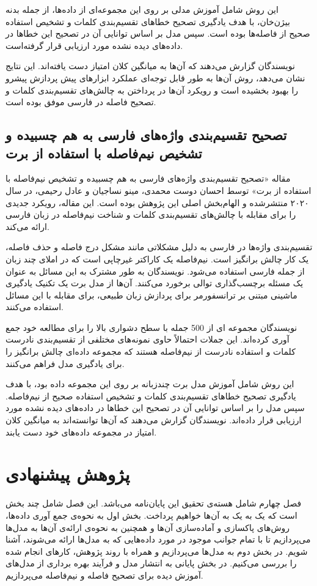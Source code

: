 این روش شامل آموزش مدلی بر روی این مجموعه‌ای از داده‌ها، از جمله بدنه بیژن‌خان، با هدف یادگیری تصحیح خطاهای تقسیم‌بندی کلمات و تشخیص استفاده صحیح از فاصله‌ها بوده است. سپس مدل بر اساس توانایی آن در تصحیح این خطاها در داده‌های دیده نشده مورد ارزیابی قرار گرفته‌است.

نویسندگان گزارش می‌دهند که آن‌ها به میانگین کلان امتیاز دست یافته‌اند. این نتایج نشان می‌دهد، روش آن‌ها به طور قابل توجه‌ای عملکرد ابزارهای پیش پردازش پیشرو را بهبود بخشیده است و رویکرد آن‌ها در پرداختن به چالش‌های تقسیم‌بندی کلمات و تصحیح فاصله‌ در فارسی موفق بوده است.\cite{Panahandeh2019CorrectionOS}


\section{تصحیح تقسیم‌بندی واژه‌های فارسی به هم چسبیده و تشخیص نیم‌فاصله با استفاده از برت}
\hspace{30pt}
مقاله «تصحیح تقسیم‌بندی واژه‌های فارسی به هم چسبیده و تشخیص نیم‌فاصله با استفاده از برت» توسط احسان دوست محمدی، مینو نساجیان و عادل رحیمی، در سال ۲۰۲۰ منتشر‌شده و الهام‌بخش اصلی این پژوهش بوده است. این مقاله، رویکرد جدیدی را برای مقابله با چالش‌های تقسیم‌بندی کلمات و شناخت نیم‌فاصله در زبان فارسی ارائه می‌کند.

تقسیم‌بندی واژه‌ها در فارسی به دلیل مشکلاتی مانند مشکل درج فاصله و حذف فاصله، یک کار چالش برانگیز است. نیم‌فاصله یک کاراکتر غیرچاپی است که در املای چند زبان از جمله فارسی استفاده می‌شود. نویسندگان به طور مشترک به این مسائل به عنوان یک مسئله برچسب‌گذاری توالی برخورد می‌کنند. آن‌ها از مدل برت یک تکنیک یادگیری ماشینی مبتنی بر ترانسفورمر برای پردازش زبان طبیعی، برای مقابله با این مسائل استفاده می‌کنند.

نویسندگان مجموعه ای از 500 جمله با سطح دشواری بالا را برای مطالعه خود جمع آوری کرده‌اند. این جملات احتمالاً حاوی نمونه‌های مختلفی از تقسیم‌بندی نادرست کلمات و استفاده نادرست از نیم‌فاصله هستند که مجموعه داده‌ای چالش برانگیز را برای یادگیری مدل فراهم می‌کنند.

این روش شامل آموزش مدل برت چند‌زبانه بر روی این مجموعه داده بود، با هدف یادگیری تصحیح خطاهای تقسیم‌بندی کلمات و تشخیص استفاده صحیح از نیم‌فاصله. سپس مدل را بر اساس توانایی آن در تصحیح این خطاها در داده‌های دیده نشده مورد ارزیابی قرار داده‌اند. نویسندگان گزارش می‌دهند که آن‌ها توانسته‌اند به میانگین کلان امتیاز  در مجموعه داده‌‌های خود دست یابند. \cite{doostmohammadi-etal-2020-joint}
\chapter{پژوهش پیشنهادی}
فصل چهارم شامل هسته‌ى تحقیق این پایان‌نامه می‌باشد. این فصل شامل چند بخش است که یک به یک به آن‌ها خواهیم پرداخت. بخش اول به نحوه‌ی جمع آوری داده‌ها، روش‌های پاکسازی و آماده‌سازی آن‌ها و همچنین به نحوه‌ی ارائه‌ی آن‌ها به مدل‌ها می‌پردازیم تا با تمام جوانب موجود در مورد داده‌هایی که به مدل‌ها ارائه می‌شوند‌، آشنا شویم. در بخش دوم به مدل‌ها می‌پردازیم و همراه با روند پژوهش، کار‌های انجام شده را بررسی می‌کنیم. در بخش پایانی به انتشار مدل و فرآیند بهره برداری از مدل‌های آموزش دیده برای تصحیح فاصله و نیم‌فاصله می‌پردازیم.


